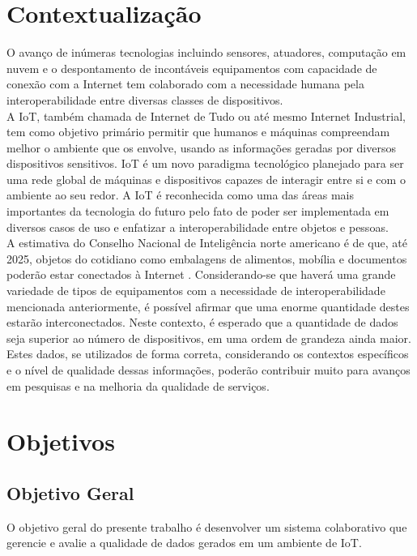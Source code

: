 \section{Contextualização}
\qquad
O avanço de inúmeras tecnologias incluindo sensores, atuadores, computação em nuvem e o despontamento de
incontáveis equipamentos com capacidade de conexão com a Internet tem colaborado com a necessidade humana pela interoperabilidade entre diversas classes de dispositivos.
\\ \null
\qquad
A \acrfull{IoT}, também chamada de Internet de Tudo ou até mesmo Internet Industrial, tem como objetivo primário %
permitir que humanos e máquinas compreendam melhor o ambiente que os envolve, usando as informações geradas por
diversos dispositivos sensitivos. \acrshort{IoT} é um novo paradigma tecnológico planejado para ser uma rede %
global de máquinas e dispositivos capazes de interagir entre si e com o ambiente ao seu redor.
A \acrshort{IoT} é reconhecida como uma das áreas mais importantes da tecnologia do futuro pelo fato de %
poder ser implementada em diversos casos de uso e enfatizar a interoperabilidade entre objetos e pessoas.
\\ \null
\qquad A estimativa do Conselho Nacional de Inteligência norte americano é de que, até 2025, objetos do cotidiano como embalagens de alimentos, mobília e documentos
poderão estar conectados à Internet \cite{intelsix}. Considerando-se que haverá uma grande variedade de tipos de equipamentos com a necessidade de interoperabilidade mencionada anteriormente, %
é possível afirmar que uma enorme quantidade destes estarão interconectados. Neste contexto, %
é esperado que a quantidade de dados seja superior ao número de dispositivos, em uma ordem de grandeza ainda maior.
Estes dados, se utilizados de forma correta, considerando os contextos específicos e o nível de qualidade dessas informações, poderão
contribuir muito para avanços em pesquisas e na melhoria da qualidade de serviços.
\section{Objetivos}
\subsection{Objetivo Geral}
\qquad O objetivo geral do presente trabalho é desenvolver um sistema colaborativo que gerencie e avalie a qualidade de dados
gerados em um ambiente de \acrlong{IoT}.
